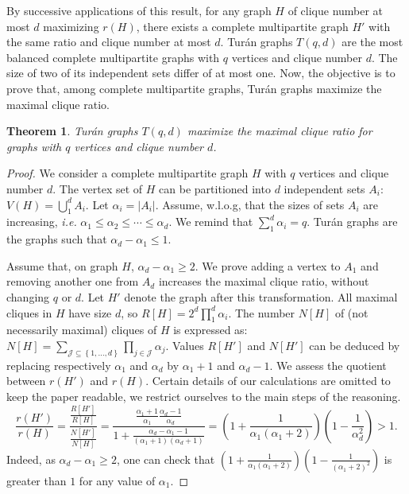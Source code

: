 \documentclass{article}
\newtheorem{theorem}{Theorem}
\newcommand{\set}[1]{\left\{ #1 \right\}}
\newcommand{\card}[1]{\left| #1 \right|}
\begin{document}
By successive applications of this result, for any graph $H$ of clique number at most $d$ maximizing $r(H)$, there exists a complete multipartite graph $H'$ with the same ratio and clique number at most $d$. 
Tur\'an graphs $T(q,d)$ are the most balanced complete multipartite graphs with $q$ vertices and clique number $d$. The size of two of its independent sets differ of at most one. Now, the objective is to prove that, among complete multipartite graphs, Tur\'an graphs maximize the maximal clique ratio.

\begin{theorem}
Tur\'an graphs $T(q,d)$ maximize the maximal clique ratio for graphs with $q$ vertices and clique number $d$.
\label{th:turan}
\end{theorem}
\begin{proof}
We consider a complete multipartite graph $H$ with $q$ vertices and clique number $d$. The vertex set of $H$ can be partitioned into $d$ independent sets $A_i$: $V(H) = \bigcup_1^d A_i$. Let $\alpha_i = \card{A_i}$. Assume, w.l.o.g, that the sizes of sets $A_i$ are increasing, {\em i.e.} $\alpha_1 \le \alpha_2 \le \cdots \le \alpha_d$. We remind that $\sum_1^d \alpha_i = q$. Tur\'an graphs are the graphs such that $\alpha_d - \alpha_1 \le 1$.

Assume that, on graph $H$, $\alpha_d - \alpha_1 \ge 2$. We prove adding a vertex to $A_1$ and removing another one from $A_d$ increases the maximal clique ratio, without changing $q$ or $d$. Let $H'$ denote the graph after this transformation. All maximal cliques in $H$ have size $d$, so $R\left[ H\right] = 2^d \prod_1^d \alpha_i$. The number $N\left[ H\right]$ of (not necessarily maximal) cliques of $H$ is expressed as: $N\left[ H\right] = \sum\limits_{\mathcal{J} \subseteq \set{1,\ldots,d}} \prod_{j \in \mathcal{J}} \alpha_j$. Values $R\left[ H'\right]$ and $N\left[ H'\right]$ can be deduced by replacing respectively $\alpha_1$ and $\alpha_d$ by $\alpha_1 + 1$ and $\alpha_d-1$. We assess the quotient between $r(H')$ and $r(H)$. Certain details of our calculations are omitted to keep the paper readable, we restrict ourselves to the main steps of the reasoning. 
\[
\frac{r(H')}{r(H)} = \frac{\frac{R\left[ H'\right]}{R\left[ H\right]}}{\frac{N\left[ H'\right]}{N\left[ H\right]}} = \frac{\frac{\alpha_1+1}{\alpha_1}\frac{\alpha_d-1}{\alpha_d}}{1+\frac{\alpha_d-\alpha_1-1}{(\alpha_1+1)(\alpha_d+1)}} = \left(1+\frac{1}{\alpha_1(\alpha_1+2)}\right)\left(1-\frac{1}{\alpha_d^2}\right) >  1.
\]
Indeed, as $\alpha_d - \alpha_1 \ge 2$, one can check that $\left(1+\frac{1}{\alpha_1(\alpha_1+2)}\right)\left(1-\frac{1}{(\alpha_1+2)^2}\right)$ is greater than $1$ for any value of $\alpha_1$.
\end{proof}
\end{document}
